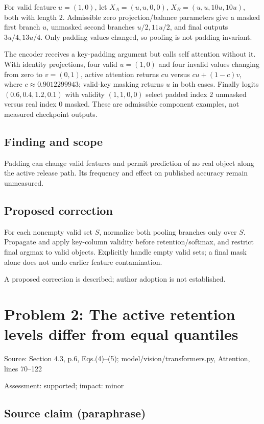 \documentclass[11pt]{article}
\begin{document}
For valid feature \(u=(1,0)\), let \(X_A=(u,u,0,0)\), \(X_B=(u,u,10u,10u)\), both with length \(2\). Admissible zero projection/balance parameters give a masked first branch \(u\), unmasked second branches \(u/2,11u/2\), and final outputs \(3u/4,13u/4\). Only padding values changed, so pooling is not padding-invariant.

The encoder receives a key-padding argument but calls self attention without it. With identity projections, four valid \(u=(1,0)\) and four invalid values changing from zero to \(v=(0,1)\), active attention returns \(cu\) versus \(cu+(1-c)v\), where \(c\approx0.9012299943\); valid-key masking returns \(u\) in both cases. Finally logits \((0.6,0.4,1.2,0.1)\) with validity \((1,1,0,0)\) select padded index \(2\) unmasked versus real index \(0\) masked. These are admissible component examples, not measured checkpoint outputs.

\subsection*{Finding and scope}

Padding can change valid features and permit prediction of no real object along the active release path. Its frequency and effect on published accuracy remain unmeasured.

\subsection*{Proposed correction}

For each nonempty valid set \(S\), normalize both pooling branches only over \(S\). Propagate and apply key-column validity before retention/softmax, and restrict final argmax to valid objects. Explicitly handle empty valid sets; a final mask alone does not undo earlier feature contamination.

A proposed correction is described; author adoption is not established.

\section*{Problem 2: The active retention levels differ from equal quantiles}

Source: Section 4.3, p.6, Eqs.(4)–(5); model/vision/transformers.py, Attention, lines 70–122

Assessment: supported; impact: minor

\subsection*{Source claim (paraphrase)}
\end{document}
